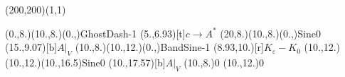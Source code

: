\unitlength=1bp%

\begin{feynartspicture}(200,200)(1,1)

\FADiagram{}
\FAProp(0.,8.)(10.,8.)(0.,){GhostDash}{-1}
\FALabel(5.,6.93)[t]{$c\to A^*$}
\FAProp(20,8.)(10.,8.)(0.,){Sine}{0}
\FALabel(15.,9.07)[b]{$A|_V$}
\FAProp(10.,8.)(10.,12.)(0.,){BandSine}{-1}
\FALabel(8.93,10.)[r]{$K_\varepsilon-K_0$}
\FAProp(10.,12.)(10.,12.)(10.,16.5){Sine}{0}
\FALabel(10.,17.57)[b]{$A|_V$}
\FAVert(10.,8.){0}
\FAVert(10.,12.){0}
\end{feynartspicture}

